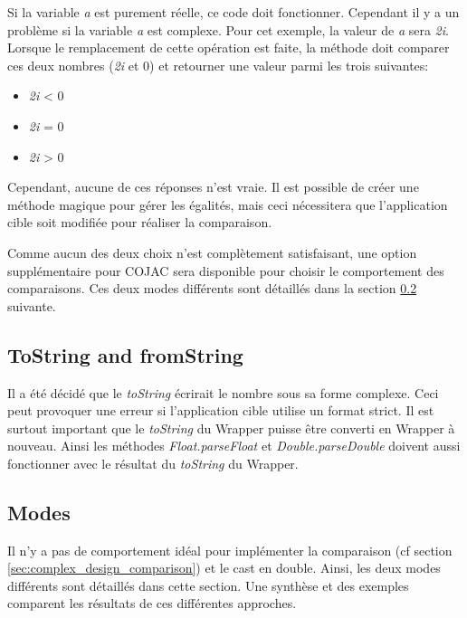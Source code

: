 Si la variable \textit{a} est purement réelle, ce code doit fonctionner. Cependant il y a un problème si la variable \textit{a} est complexe. Pour cet exemple, la valeur de \textit{a} sera \textit{2i}. Lorsque le remplacement de cette opération est faite, la méthode doit comparer ces deux nombres (\textit{2i} et 0) et retourner une valeur parmi les trois suivantes:

\begin{itemize}
    \item \textit{2i} < 0
    \item \textit{2i} = 0
    \item \textit{2i} > 0
\end{itemize}

Cependant, aucune de ces réponses n'est vraie. Il est possible de créer une méthode magique pour gérer les égalités, mais ceci nécessitera que l'application cible soit modifiée pour réaliser la comparaison.

Comme aucun des deux choix n'est complètement satisfaisant, une option supplémentaire pour \gls{COJAC} sera disponible pour choisir le comportement des comparaisons. Ces deux modes différents sont détaillés dans la section \ref{sec:complex_design_modes} suivante.

\subsection{ToString and fromString}

Il a été décidé que le \textit{toString} écrirait le nombre sous sa forme complexe. Ceci peut provoquer une erreur si l'application cible utilise un format strict. Il est surtout important que le \textit{toString} du \gls{Wrapper} puisse être converti en \gls{Wrapper} à nouveau. Ainsi les méthodes \textit{Float.parseFloat} et \textit{Double.parseDouble} doivent aussi fonctionner avec le résultat du \textit{toString} du \gls{Wrapper}.

\subsection{Modes}
\label{sec:complex_design_modes}

Il n'y a pas de comportement idéal pour implémenter la comparaison (cf section \ref{sec:complex_design_comparison}) et le cast en double. Ainsi, les deux modes différents sont détaillés dans cette section. Une synthèse et des exemples comparent les résultats de ces différentes approches.

